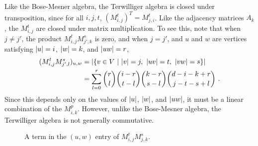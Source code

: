 \documentclass{report}
\newcommand{\wt}[1]{\abs{ #1 }}
\newcommand{\Mijt}{M_{i, j}^t}
\begin{document}
    Like the Bose-Mesner algebra, the Terwilliger algebra is closed under
    transposition, since for all $i, j, t$, $(\Mijt)^T = M_{j, i}^t$.  Like the
    adjacency matrices $A_k$, the $\Mijt$ are closed under matrix
    multiplication.  To see this, note that when $j \neq j'$, the product $\Mijt
    M_{j', k}^s$ is zero, and when $j = j'$, and $u$ and $w$ are vertices
    satisfying $\wt{u} = i$, $\wt{w} = k$, and $\wt{uw} = r$,
    \begin{alignat*}{2}
      (\Mijt M_{j', l}^s)_{u, w} &=
        \abs{\buildset{v \in V}{\wt{v} = j,\ \wt{uv} = t,\ \wt{vw} = s}} \\
      &= \sum_{l=0}^r \binom{r}{l} \binom{i-r}{t-l} \binom{k-r}{s-l}
        \binom{d-i-k+r}{j-t-s+l} \ .
    \end{alignat*}
    Since this depends only on the values of $\wt{u}$, $\wt{w}$, and $\wt{uw}$,
    it must be a linear combination of the $M_{i, k}^p$.  However, unlike the
    Bose-Mesner algebra, the Terwilliger algebra is not generally commutative.

    \begin{figure}[h]
      \centering
      \caption{
        A term in the $(u, w)$ entry of $\Mijt M_{j, k}^s$.
      }
    \end{figure}
\end{document}

